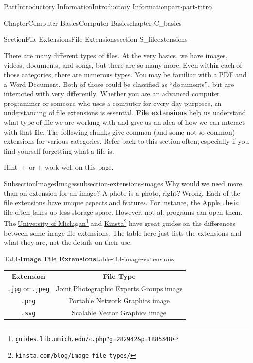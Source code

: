 \documentclass[twoside,10pt,]{book}
\newcommand{\tabularfont}{\relax}
\newcommand{\mono}[1]{\texttt{#1}}
\newcommand{\terminology}[1]{\textbf{#1}}
\newcommand{\kbd}[1]{\keys{{#1}}}
\begin{document}
\begin{partptx}{Part}{Introductory Information}{}{Introductory Information}{}{}{part-part-intro}
\begin{chapterptx}{Chapter}{Computer Basics}{}{Computer Basics}{}{}{chapter-C_basics}
\begin{sectionptx}{Section}{File Extensions}{}{File Extensions}{}{}{section-S_fileextensions}
\begin{introduction}{}
There are many different types of files. At the very basics, we have images, videos, documents, and songs, but there are so many more. Even within each of those categories, there are numerous types. You may be familiar with a PDF and a Word Document. Both of those could be classified as ``documents'', but are interacted with very differently. Whether you are an advanced computer programmer or someone who uses a computer for every-day purposes, an understanding of file extensions is essential. \terminology{File extensions} help us understand what type of file we are working with and give us an idea of how we can interact with that file. The following chunks give common (and some not so common) extensions for various categories. Refer back to this section often, especially if you find yourself forgetting what a file is.%
\par
Hint: \kbd{Control} + \kbd{F} or \kbd{Command} + \kbd{F} work well on this page.%
\end{introduction}%
%
%
\typeout{************************************************}
\typeout{************************************************}
%
\begin{subsectionptx}{Subsection}{Images}{}{Images}{}{}{subsection-extensions-images}
%
Why would we need more than on extension for an image? A photo is a photo, right? Wrong. Each of the file extensions have unique aspects and features. For instance, the Apple \mono{.heic} file often takes up less storage space. However, not all programs can open them. The \href{https://guides.lib.umich.edu/c.php?g=282942\&p=1885348}{University of Michigan}\footnote{\nolinkurl{guides.lib.umich.edu/c.php?g=282942\&p=1885348}\label{fn-extensions-images-c-c}} and \href{https://kinsta.com/blog/image-file-types/}{Kinsta}\footnote{\nolinkurl{kinsta.com/blog/image-file-types/}\label{fn-extensions-images-c-e}} have great guides on the differences between some image file extensions. The table here just lists the extensions and what they are, not the details on their use.%
\begin{tableptx}{Table}{\textbf{Image File Extensions}}{table-tbl-image-extensions}{}%
\centering%
{\tabularfont%
\begin{tabular}{cc}
{\bfseries{}Extension}&{\bfseries{}File Type}\tabularnewline[0pt]
\mono{.jpg} or \mono{.jpeg}&Joint Photographic Experts Groups image\tabularnewline[0pt]
\mono{.png}&Portable Network Graphics image\tabularnewline[0pt]
\mono{.svg}&Scalable Vector Graphics image\tabularnewline[0pt]

\end{tabular}}
\end{tableptx}
\end{subsectionptx}
\end{sectionptx}
\end{chapterptx}
\end{partptx}
\end{document}
